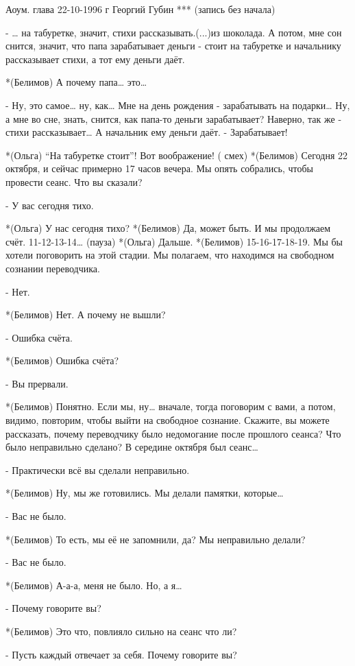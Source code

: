 Аоум. глава 22-10-1996 г
Георгий Губин
***
(запись без начала)

- … на табуретке, значит, стихи рассказывать.(...)из шоколада. А потом, мне сон снится, значит, что папа зарабатывает деньги - стоит на табуретке и начальнику рассказывает стихи, а тот ему деньги даёт.

*(Белимов) А почему папа… это…

- Ну, это самое… ну, как… Мне на день рождения - зарабатывать на подарки… Ну, а мне во сне, знать, снится, как папа-то  деньги зарабатывает? Наверно, так же - стихи рассказывает… А начальник ему деньги даёт. - Зарабатывает!  



*(Ольга) “На табуретке стоит”! Вот воображение! ( смех)
*(Белимов) Сегодня 22 октября, и сейчас примерно 17 часов вечера. Мы опять собрались, чтобы провести сеанс. 
Что вы сказали?

- У вас сегодня тихо.

*(Ольга) У нас сегодня тихо?
*(Белимов) Да, может быть. И мы продолжаем счёт. 11-12-13-14… (пауза)
*(Ольга) Дальше.
*(Белимов) 15-16-17-18-19. Мы бы хотели поговорить на этой стадии. Мы полагаем, что находимся на свободном сознании переводчика.

- Нет.

*(Белимов) Нет. А почему не вышли?

- Ошибка счёта.

*(Белимов) Ошибка счёта?

- Вы прервали.

*(Белимов) Понятно. Если мы, ну… вначале, тогда поговорим с вами, а потом, видимо, повторим, чтобы выйти на свободное сознание. Скажите, вы можете рассказать, почему переводчику было недомогание после прошлого сеанса? Что было неправильно сделано? В середине октября был сеанс…

- Практически всё вы сделали неправильно.

*(Белимов) Ну, мы же готовились. Мы делали памятки, которые…

- Вас не было.

*(Белимов) То есть, мы её не запомнили, да? Мы неправильно делали?

- Вас не было.

*(Белимов) А-а-а, меня не было. Но, а я…

- Почему говорите вы?

*(Белимов) Это что, повлияло сильно на сеанс что ли?

- Пусть каждый отвечает за себя. Почему говорите вы?

